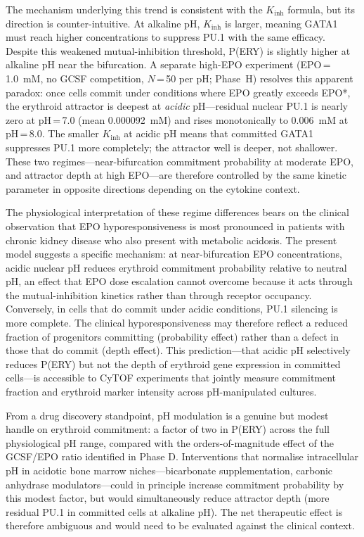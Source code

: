 The mechanism underlying this trend is consistent with the $K_\text{inh}$ formula, but its direction is counter-intuitive. At alkaline pH, $K_\text{inh}$ is larger, meaning GATA1 must reach higher concentrations to suppress PU.1 with the same efficacy. Despite this weakened mutual-inhibition threshold, P(ERY) is slightly higher at alkaline pH near the bifurcation. A separate high-EPO experiment (EPO\,=\,1.0~mM, no GCSF competition, $N$\,=\,50 per pH; Phase~H) resolves this apparent paradox: once cells commit under conditions where EPO greatly exceeds EPO*, the erythroid attractor is deepest at \emph{acidic} pH---residual nuclear PU.1 is nearly zero at pH\,=\,7.0 (mean 0.000092~mM) and rises monotonically to 0.006~mM at pH\,=\,8.0. The smaller $K_\text{inh}$ at acidic pH means that committed GATA1 suppresses PU.1 more completely; the attractor well is deeper, not shallower. These two regimes---near-bifurcation commitment probability at moderate EPO, and attractor depth at high EPO---are therefore controlled by the same kinetic parameter in opposite directions depending on the cytokine context.

The physiological interpretation of these regime differences bears on the clinical observation that EPO hyporesponsiveness is most pronounced in patients with chronic kidney disease who also present with metabolic acidosis. The present model suggests a specific mechanism: at near-bifurcation EPO concentrations, acidic nuclear pH reduces erythroid commitment probability relative to neutral pH, an effect that EPO dose escalation cannot overcome because it acts through the mutual-inhibition kinetics rather than through receptor occupancy. Conversely, in cells that do commit under acidic conditions, PU.1 silencing is more complete. The clinical hyporesponsiveness may therefore reflect a reduced fraction of progenitors committing (probability effect) rather than a defect in those that do commit (depth effect). This prediction---that acidic pH selectively reduces P(ERY) but not the depth of erythroid gene expression in committed cells---is accessible to CyTOF experiments that jointly measure commitment fraction and erythroid marker intensity across pH-manipulated cultures.

From a drug discovery standpoint, pH modulation is a genuine but modest handle on erythroid commitment: a factor of two in P(ERY) across the full physiological pH range, compared with the orders-of-magnitude effect of the GCSF/EPO ratio identified in Phase D. Interventions that normalise intracellular pH in acidotic bone marrow niches---bicarbonate supplementation, carbonic anhydrase modulators---could in principle increase commitment probability by this modest factor, but would simultaneously reduce attractor depth (more residual PU.1 in committed cells at alkaline pH). The net therapeutic effect is therefore ambiguous and would need to be evaluated against the clinical context.

